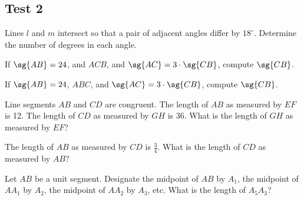 \documentclass[11pt]{book}
\theoremstyle{bkplain}
\theoremstyle{XIplainnote}
\theoremstyle{bkplain}
\theoremstyle{bkplain}
\begin{document}
\subsection*{Test 2}
\begin{exlist}
\item Lines $l$ and $m$ intersect so that a pair of adjacent angles differ by
  $18^\circ$. Determine the number of degrees in each angle.
\item If $\sg{AB} = 24$, and $ACB$, and $\sg{AC} = 3 \cdot \sg{CB}$, compute
  $\sg{CB}$.
\item If $\sg{AB} = 24$, $ABC$, and $\sg{AC} = 3 \cdot \sg{CB}$, compute
  $\sg{CB}$.
\item Line segments $AB$ and $CD$ are congruent. The length of $AB$ as measured
  by $EF$ is 12. The length of $CD$ as measured by $GH$ is 36. What is the
  length of $GH$ as measured by $EF$?
\item The length of $AB$ as measured by $CD$ is $\tfrac{3}{4}$. What is the
  length of $CD$ as measured by $AB$?
\item Let $AB$ be a unit segment. Designate the midpoint of $AB$ by $A_1$, the
  midpoint of $AA_1$ by $A_2$, the midpoint of $AA_2$ by $A_3$, etc. What is
  the length of $A_5A_3$?
\end{exlist}
\end{document}
